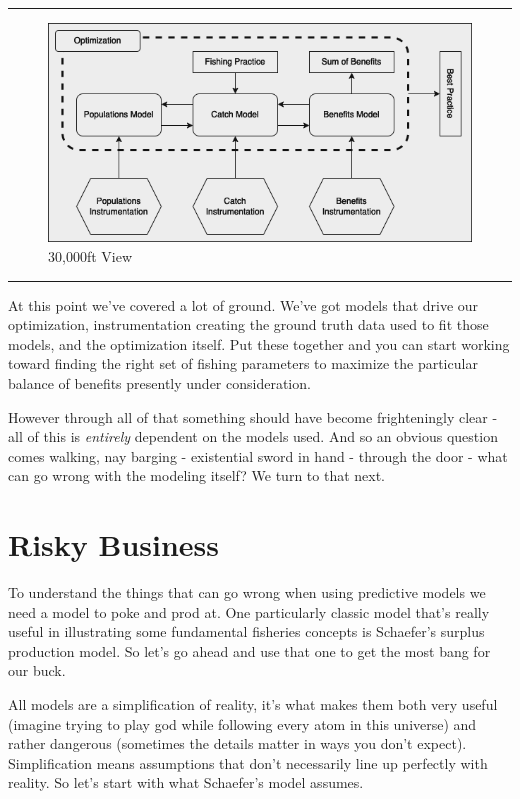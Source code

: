\documentclass[11pt,a5paper]{book}
\begin{document}
\noindent \rule{\textwidth}{0.5pt} 
\begin{figure}[h!] 
  \includegraphics[width=\linewidth]{drawings/high_level.png}
  \caption{30,000ft View}
  \label{fig:high_level}
\end{figure}
\newline
\rule{\textwidth}{0.5pt} 
\vspace{5pt}

At this point we've covered a lot of ground. We've got models that drive our optimization, instrumentation creating the ground truth data used to fit those models, and the optimization itself. Put these together and you can start working toward finding the right set of fishing parameters to maximize the particular balance of benefits presently under consideration. 
\newline

However through all of that something should have become frighteningly clear - all of this is \textit{entirely} dependent on the models used. And so an obvious question comes walking, nay barging - existential sword in hand - through the door - what can go wrong with the modeling itself? We turn to that next. 
\newpage

\chapter{Risky Business}
To understand the things that can go wrong when using predictive models we need a model to poke and prod at. One particularly classic model that's really useful in illustrating some fundamental fisheries concepts is Schaefer's surplus production model. So let's go ahead and use that one to get the most bang for our buck.
\newline

All models are a simplification of reality, it's what makes them both very useful (imagine trying to play god while following every atom in this universe) and rather dangerous (sometimes the details matter in ways you don't expect). Simplification means assumptions that don't necessarily line up perfectly with reality. So let's start with what Schaefer's model assumes. 
\newline
\end{document}
